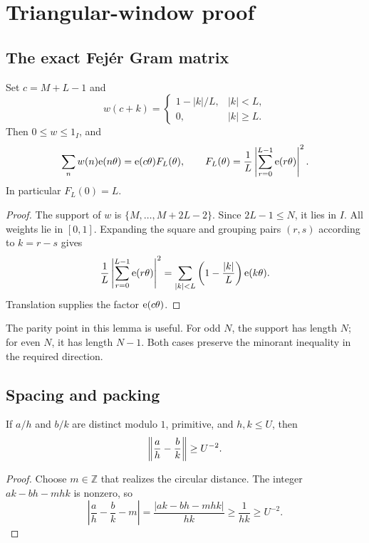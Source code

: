 \section{Triangular-window proof}
\label{sec:theorem}

\subsection{The exact Fejér Gram matrix}

\begin{lemma}
\label{lem:triangle}
Set \(c=M+L-1\) and
\[
w(c+k)=
\begin{cases}
1-|k|/L,& |k|<L,\\
0,& |k|\geq L.
\end{cases}
\]
Then \(0\leq w\leq1_I\), and
\[
\sum_n w(n)\mathrm{e}(n\theta)=\mathrm{e}(c\theta)F_L(\theta),
\qquad
F_L(\theta)=\frac1L\left|\sum_{r=0}^{L-1}\mathrm{e}(r\theta)\right|^2.
\]
In particular \(F_L(0)=L\).
\end{lemma}

\begin{proof}
The support of \(w\) is
\(\{M,\ldots,M+2L-2\}\).  Since \(2L-1\leq N\), it lies in \(I\).
All weights lie in \([0,1]\).  Expanding the square and grouping pairs
\((r,s)\) according to \(k=r-s\) gives
\[
\frac1L\left|\sum_{r=0}^{L-1}\mathrm{e}(r\theta)\right|^2
=\sum_{|k|<L}\left(1-\frac{|k|}{L}\right)\mathrm{e}(k\theta).
\]
Translation supplies the factor \(\mathrm{e}(c\theta)\).
\end{proof}

The parity point in this lemma is useful.  For odd \(N\), the support has
length \(N\); for even \(N\), it has length \(N-1\).  Both cases preserve the
minorant inequality in the required direction.

\subsection{Spacing and packing}

\begin{lemma}
\label{lem:spacing}
If \(a/h\) and \(b/k\) are distinct modulo \(1\), primitive, and
\(h,k\leq U\), then
\[
\left\lVert \frac ah-\frac bk\right\rVert\geq U^{-2}.
\]
\end{lemma}

\begin{proof}
Choose \(m\in\mathbb Z\) that realizes the circular distance.  The integer
\(ak-bh-mhk\) is nonzero, so
\[
\left|\frac ah-\frac bk-m\right|
=\frac{|ak-bh-mhk|}{hk}\geq\frac1{hk}\geq U^{-2}.
\]
\end{proof}

